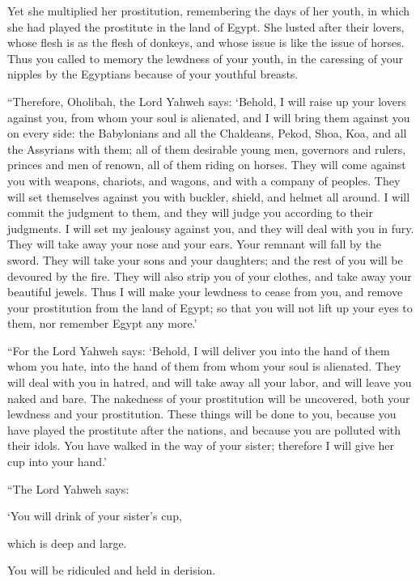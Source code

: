 {Yet she multiplied her prostitution, remembering the days of her youth, in which she had played the prostitute in the land of Egypt.
She lusted after their lovers, whose flesh is as the flesh of donkeys, and whose issue is like the issue of horses.
Thus you called to memory the lewdness of your youth, in the caressing of your nipples by the Egyptians because of your youthful breasts.
\par }{\PP {}“Therefore, Oholibah, the Lord Yahweh says: ‘Behold, I will raise up your lovers against you, from whom your soul is alienated, and I will bring them against you on every side:
the Babylonians and all the Chaldeans, Pekod, Shoa, Koa, and all the Assyrians with them; all of them desirable young men, governors and rulers, princes and men of renown, all of them riding on horses.
They will come against you with weapons, chariots, and wagons, and with a company of peoples. They will set themselves against you with buckler, shield, and helmet all around. I will commit the judgment to them, and they will judge you according to their judgments.
I will set my jealousy against you, and they will deal with you in fury. They will take away your nose and your ears. Your remnant will fall by the sword. They will take your sons and your daughters; and the rest of you will be devoured by the fire.
They will also strip you of your clothes, and take away your beautiful jewels.
Thus I will make your lewdness to cease from you, and remove your prostitution from the land of Egypt; so that you will not lift up your eyes to them, nor remember Egypt any more.’
\par }{\PP {}“For the Lord Yahweh says: ‘Behold, I will deliver you into the hand of them whom you hate, into the hand of them from whom your soul is alienated.
They will deal with you in hatred, and will take away all your labor, and will leave you naked and bare. The nakedness of your prostitution will be uncovered, both your lewdness and your prostitution.
These things will be done to you, because you have played the prostitute after the nations, and because you are polluted with their idols.
You have walked in the way of your sister; therefore I will give her cup into your hand.’
\par }{\PP {}“The Lord Yahweh says:
\par }{\Q ‘You will drink of your sister’s cup,
\par }{\QB which is deep and large.
\par }{\Q You will be ridiculed and held in derision.
}

